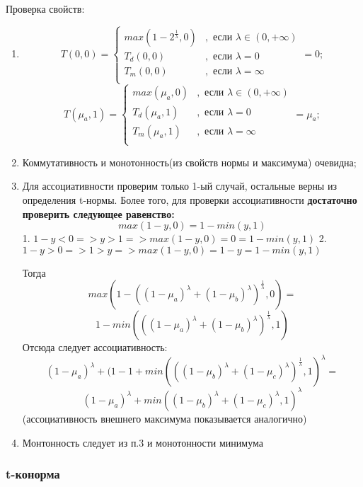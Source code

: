 \documentclass[12pt]{article}
\begin{document}
Проверка свойств:
\begin{enumerate}
    \item $$
      T(0, 0) = 
      \begin{cases}
         max\left(1-2^{\frac{1}{\lambda}}, 0\right) &, \text{ если }\lambda\in(0, +\infty)\\
         T_d(0, 0) &, \text{ если }\lambda=0\\
         T_m(0, 0) &, \text{ если }\lambda=\infty\\ 
      \end{cases} = 0;
      $$
      $$
      T(\mu_a, 1) = 
      \begin{cases}
         max\left(\mu_a, 0\right) &, \text{ если }\lambda\in(0, +\infty)\\
         T_d(\mu_a, 1) &, \text{ если }\lambda=0\\
         T_m(\mu_a, 1) &, \text{ если }\lambda=\infty\\ 
      \end{cases} = \mu_a;
      $$
  \item Коммутативность и монотонность(из свойств нормы и максимума) очевидна;
  \item Для ассоциативности проверим только 1-ый случай, остальные верны из определения t-нормы.
  Более того, для проверки ассоциативности \textbf{достаточно проверить следующее равенство:}
      $$ 
      max(1-y, 0) = 1-min(y, 1)
      $$
      1. $1-y<0 => y>1 => max(1-y, 0) = 0 = 1-min(y, 1)$
      2. $1-y>0 => 1>y => max(1-y, 0) = 1-y = 1-min(y, 1)$
      
      Тогда 
      $$
      max\left(1-\left((1-\mu_a)^\lambda+(1-\mu_b)^\lambda\right)^{\frac{1}{\lambda}},
      0\right) = 
      $$
      $$
      1-min\left(((1-\mu_a)^\lambda+(1-\mu_b)^\lambda)^{\frac{1}{\lambda}},
      1\right) 
      $$
      Отсюда следует ассоциативность:
      $$
      (1-\mu_a)^\lambda+(1-1+min\left(((1-\mu_b)^\lambda+(1-\mu_c)^\lambda)^{\frac{1}{\lambda}},
      1\right)^\lambda =
      $$
      $$
      (1-\mu_a)^\lambda + min\left((1-\mu_b)^\lambda+(1-\mu_c)^\lambda, 1\right)^\lambda
      $$
      (ассоциативность внешнего максимума показывается аналогично)
  \item Монтонность следует из п.3 и монотонности минимума
\end{enumerate}

\subsubsection{t-конорма}
\end{document}
